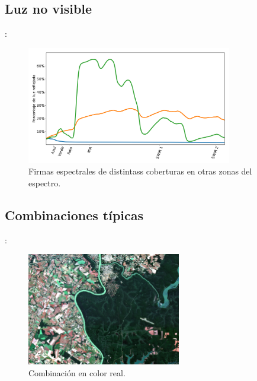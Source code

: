 \documentclass[handout,aspectratio=169]{beamer}
\begin{document}
\subsection{Luz no visible}

\begin{frame}{\secname : \subsecname}
    \begin{figure}[h!]
        \centering
        \includegraphics[width=0.8\textwidth]{fig:spec.png}
        \caption{Firmas espectrales de distintass coberturas en otras zonas del espectro.}
        \label{fig:spec}
    \end{figure}
\end{frame}

\subsection{Combinaciones típicas}

\begin{frame}{\secname : \subsecname}
    \begin{figure}[h!]
        \centering
        \includegraphics[width=0.6\textwidth]{4-3-2.jpeg}
        \caption{Combinación en color real.}
        \label{4-3-2}
    \end{figure}
\end{frame}
\end{document}
